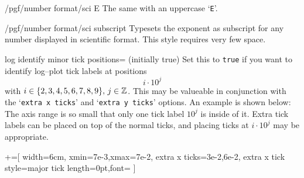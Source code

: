 {\begin{key}{/pgf/number format/sci E}
The same with an uppercase `\texttt{E}'.

\begin{codeexample}[]
\end{codeexample}
\end{key}

\begin{key}{/pgf/number format/sci subscript}
Typesets the exponent as subscript for any number displayed in scientific format. This style requires very few space.

\begin{codeexample}[]
\end{codeexample}
\end{key}
}


\label{sec:identify:minor:log}%
\begin{pgfplotskey}{log identify minor tick positions= (initially true)}
Set this to \texttt{true} if you want to identify log--plot tick labels at positions 
\[ i \cdot 10^j \]
with $i \in \{2,3,4,5,6,7,8,9\},\, j \in \mathbb{Z}$. This may be valueable in conjunction with the `\texttt{extra x ticks}' and `\texttt{extra y ticks}' options. An example is shown below: The axis range is so small that only one tick label $10^j$ is inside of it. Extra tick labels can be placed on top of the normal ticks, and placing ticks at $i \cdot 10^j $ may be appropriate.
\begin{codeexample}[]
+=[%
	width=6cm,
	xmin=7e-3,xmax=7e-2,
	extra x ticks={3e-2,6e-2},
	extra x tick style={major tick length=0pt,font=\footnotesize}
]%
%
\hspace{0.2cm}
%
\end{codeexample}
\end{pgfplotskey}

